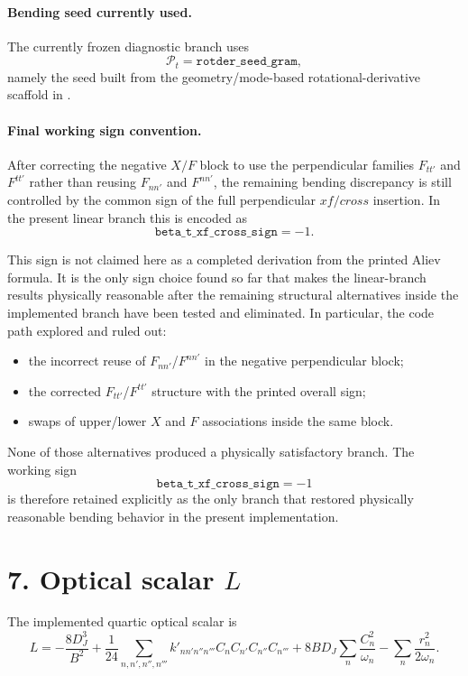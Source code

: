 \documentclass[11pt]{article}
\begin{document}
\paragraph{Bending seed currently used.}
The currently frozen diagnostic branch uses
\[
\mathcal{P}_t = \texttt{rotder\_seed\_gram},
\]
namely the seed built from the geometry/mode-based rotational-derivative
scaffold in
.

\paragraph{Final working sign convention.}
After correcting the negative $X/F$ block to use the perpendicular families
$F_{tt'}$ and $F^{tt'}$ rather than reusing $F_{nn'}$ and $F^{nn'}$, the
remaining bending discrepancy is still controlled by the common sign of the
full perpendicular $xf/cross$ insertion. In the present linear branch this is encoded as
\[
\texttt{beta\_t\_xf\_cross\_sign} = -1.
\]

This sign is not claimed here as a completed derivation from the printed Aliev
formula. It is the only sign choice found so far that makes the linear-branch
results physically reasonable after the remaining structural alternatives
inside the implemented branch have been tested and eliminated. In particular,
the code path explored and ruled out:
\begin{itemize}
\item the incorrect reuse of $F_{nn'}$/$F^{nn'}$ in the negative perpendicular
block;
\item the corrected $F_{tt'}$/$F^{tt'}$ structure with the printed overall sign;
\item swaps of upper/lower $X$ and $F$ associations inside the same block.
\end{itemize}
None of those alternatives produced a physically satisfactory branch. The
working sign
\[
\texttt{beta\_t\_xf\_cross\_sign} = -1
\]
is therefore retained explicitly as the only branch that restored physically
reasonable bending behavior in the present implementation.

\section*{7. Optical scalar \texorpdfstring{$L$}{L}}

The implemented quartic optical scalar is
\begin{equation}
L =
-\frac{8D_J^3}{B^2}
+ \frac{1}{24}\sum_{n,n',n'',n'''} k'_{nn'n''n'''} C_n C_{n'} C_{n''} C_{n'''}
+ 8BD_J \sum_n \frac{C_n^2}{\omega_n}
- \sum_n \frac{r_n^2}{2\omega_n}.
\end{equation}
\end{document}
